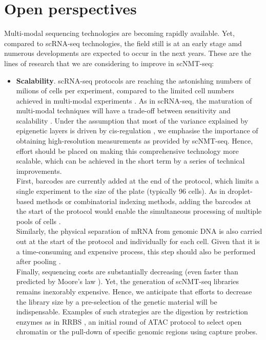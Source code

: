 \section{Open perspectives}

Multi-modal sequencing technologies are becoming rapidly available. Yet, compared to scRNA-seq technologies, the field still is at an early stage amd numerous developments are expected to occur in the next years. These are the lines of research that we are considering to improve in scNMT-seq:

\begin{itemize}

	\item \textbf{Scalability}. scRNA-seq protocols are reaching the astonishing numbers of milions of cells per experiment, compared to the limited cell numbers achieved in multi-modal experiments \cite{Cao2019,Cao2018,Guo2017}. As in scRNA-seq, the maturation of multi-modal techniques will have a trade-off between sensitivity and scalability \cite{Chappell2018}. Under the assumption that most of the variance explained by epigenetic layers is driven by cis-regulation \cite{Bell2011}, we emphasise the importance of obtaining high-resolution measurements as provided by scNMT-seq. Hence, effort should be placed on making this comprehensive technology more scalable, which can be achieved in the short term by a series of technical improvements.\\
	First, barcodes are currently added at the end of the protocol, which limits a single experiment to the size of the plate (typically 96 cells). As in droplet-based methods or combinatorial indexing methods, adding the barcodes at the start of the protocol would enable the simultaneous processing of multiple pools of cells \cite{DR-seq,Mulqueen2018}.\\
	Similarly, the physical separation of mRNA from genomic DNA is also carried out at the start of the protocol and individually for each cell. Given that it is a time-consuming and expensive process, this step should also be performed after pooling \cite{DR-seq}.\\
	Finally, sequencing costs are substantially decreasing (even faster than predicted by Moore's law \cite{Svensson2018}). Yet, the generation of scNMT-seq libraries remains inexorably expensive. Hence, we anticipate that efforts to decrease the library size by a pre-selection of the genetic material will be indispensable. Examples of such strategies are the digestion by restriction enzymes as in RRBS \cite{Guo2013}, an initial round of ATAC protocol to select open chromatin \cite{Spektor2018} or the pull-down of specific genomic regions using capture probes.


\end{itemize}
